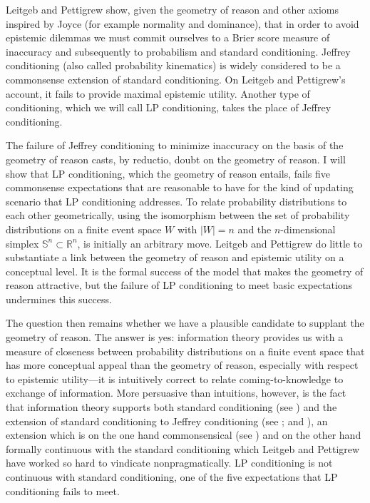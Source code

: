 \documentclass[11pt]{article}
\begin{document}
Leitgeb and Pettigrew show, given the geometry of reason and other
axioms inspired by Joyce (for example normality and dominance), that
in order to avoid epistemic dilemmas we must commit ourselves to a
Brier score measure of inaccuracy and subsequently to probabilism and
standard conditioning. Jeffrey conditioning (also called probability
kinematics) is widely considered to be a commonsense extension of
standard conditioning. On Leitgeb and Pettigrew's account, it fails to
provide maximal epistemic utility. Another type of conditioning, which
we will call LP conditioning, takes the place of Jeffrey conditioning.

The failure of Jeffrey conditioning to minimize inaccuracy on the
basis of the geometry of reason casts, by reductio, doubt on the
geometry of reason. I will show that LP conditioning, which the
geometry of reason entails, fails five commonsense expectations that
are reasonable to have for the kind of updating scenario that LP
conditioning addresses. To relate probability distributions to each
other geometrically, using the isomorphism between the set of
probability distributions on a finite event space $W$ with $|W|=n$ and
the $n$-dimensional simplex $\mathbb{S}^{n}\subset\mathbb{R}^{n}$, is
initially an arbitrary move. Leitgeb and Pettigrew do little to
substantiate a link between the geometry of reason and epistemic
utility on a conceptual level. It is the formal success of the model
that makes the geometry of reason attractive, but the failure of LP
conditioning to meet basic expectations undermines this success.

The question then remains whether we have a plausible candidate to
supplant the geometry of reason. The answer is yes: information theory
provides us with a measure of closeness between probability
distributions on a finite event space that has more conceptual appeal
than the geometry of reason, especially with respect to epistemic
utility---it is intuitively correct to relate coming-to-knowledge to
exchange of information. More persuasive than intuitions, however, is
the fact that information theory supports both standard conditioning
(see ) and the extension of standard
conditioning to Jeffrey conditioning (see
; and ), an extension
which is on the one hand commonsensical (see )
and on the other hand formally continuous with the standard
conditioning which Leitgeb and Pettigrew have worked so hard to
vindicate nonpragmatically. LP conditioning is not continuous with
standard conditioning, one of the five expectations that LP
conditioning fails to meet.
\end{document}
